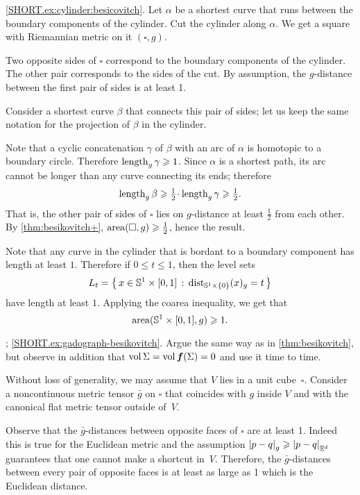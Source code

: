 \parbf{\ref{ex:cylinder};} \ref{SHORT.ex:cylinder:besicovitch}.
Let $\alpha$ be a shortest curve that runs between the boundary components of the cylinder.
Cut the cylinder along $\alpha$.
We get a square with Riemannian metric on it $(\square,g)$.

Two opposite sides of $\square$ correspond to the boundary components of the cylinder.
The other pair corresponds to the sides of the cut.
By assumption, the $g$-distance between the first pair of sides is at least 1.

Consider a shortest curve $\beta$ that connects this pair of sides;
let us keep the same notation for the projection of $\beta$ in the cylinder.

Note that a cyclic concatenation $\gamma$ of $\beta$ with an arc of $\alpha$ is homotopic to a boundary circle.
Therefore $\mathop{\rm length}\nolimits_g\gamma\geqslant1$.
Since $\alpha$ is a shortest path, its arc cannot be longer than any curve connecting its ends; therefore 
\[\length_g\beta\ge \tfrac 12\cdot\length_g \gamma\ge \tfrac 12.\]
That is, the other pair of sides of $\square$ lies on $g$-distance at least $\tfrac12$ from each other.
By \ref{thm:besikovitch+}, $\operatorname{\rm area}\nolimits(\square,g)\geqslant \tfrac12$, hence the result.

Note that any curve in the cylinder that is bordant to a boundary component has length at least $1$.
Therefore if $0\le t\le  1$, then the level sets 
\[L_t=\left\{\,{x\in \mathbb{S}^1\times[0,1]}\,:\,{\mathrm{dist}_{\mathbb{S}^1\times\{0\}}(x)_{g}=t}\,\right\}\] have length at least $1$.
Applying the coarea inequality, we get that
\[\operatorname{\rm area}\nolimits(\mathbb{S}^1\times[0,1],g)\geqslant 1.\]

\parbf{\ref{ex:gadograph}}; \ref{SHORT.ex:gadograph-besikovitch}.
Argue the same way as in \ref{thm:besikovitch}, but observe in addition that $\operatorname{\rm vol}\nolimits \Sigma=\operatorname{\rm vol}\nolimits \bm{f}(\Sigma)=0$ and use it time to time.

Without loss of generality, we may assume that $V$ lies in a unit cube~$\square$.
Consider a noncontinuous metric tensor $\bar g$ on $\square$ that coincides with $g$ inside $V$ and with the canonical flat metric tensor outside of~$V$.

Observe that the $\bar g$-distances between opposite faces of $\square$ are at least 1.
Indeed this is true for the Euclidean metric and the assumption $\dist{p}{q}{g}\ge\dist{p}{q}{\EE^d}$  guarantees that one cannot make a shortcut in~$V$.
Therefore, the $\bar g$-distances between every pair of opposite faces is at least as large as 1 which is the Euclidean distance.

